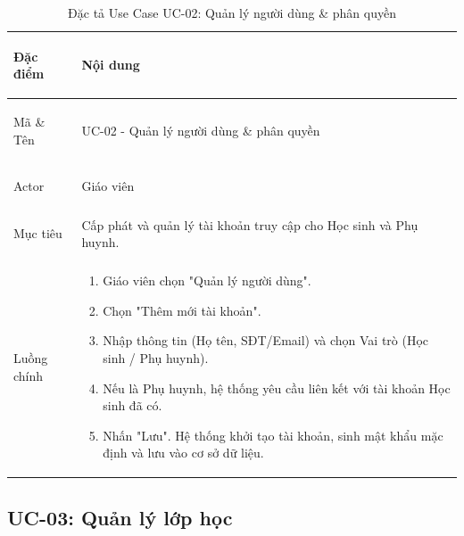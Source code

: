 \begin{table}[htbp]
\centering
\small
\caption{Đặc tả Use Case UC-02: Quản lý người dùng \& phân quyền}
\label{tab:uc02-quan-ly-nguoi-dung}
\begin{tabularx}{\textwidth}{|>{\bfseries\raggedright\arraybackslash}p{2.5cm}|X|}
\hline
Đặc điểm & Nội dung \\ \hline
Mã \& Tên & UC-02 - Quản lý người dùng \& phân quyền \\ \hline
Actor & Giáo viên \\ \hline
Mục tiêu & Cấp phát và quản lý tài khoản truy cập cho Học sinh và Phụ huynh. \\ \hline
Luồng chính & 
\begin{enumerate}
    \item Giáo viên chọn "Quản lý người dùng".
    \item Chọn "Thêm mới tài khoản".
    \item Nhập thông tin (Họ tên, SĐT/Email) và chọn Vai trò (Học sinh / Phụ huynh).
    \item Nếu là Phụ huynh, hệ thống yêu cầu liên kết với tài khoản Học sinh đã có.
    \item Nhấn "Lưu". Hệ thống khởi tạo tài khoản, sinh mật khẩu mặc định và lưu vào cơ sở dữ liệu.
\end{enumerate} \\ \hline
\end{tabularx}
\end{table}
\clearpage
\subsection{UC-03: Quản lý lớp học}

